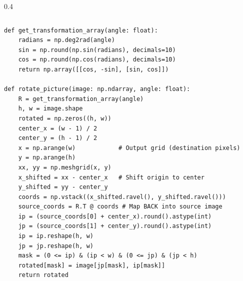 \begin{frame}
\begin{columns}[t]
\begin{column}{0.4\textwidth}

		\end{column}
	\end{columns}
\end{frame}

\begin{frame}[fragile]
\begin{verbatim}
def get_transformation_array(angle: float):
    radians = np.deg2rad(angle)
    sin = np.round(np.sin(radians), decimals=10)
    cos = np.round(np.cos(radians), decimals=10)
    return np.array([[cos, -sin], [sin, cos]])

def rotate_picture(image: np.ndarray, angle: float):
    R = get_transformation_array(angle)
    h, w = image.shape
    rotated = np.zeros((h, w))
    center_x = (w - 1) / 2
    center_y = (h - 1) / 2
    x = np.arange(w)            # Output grid (destination pixels)
    y = np.arange(h)
    xx, yy = np.meshgrid(x, y)
    x_shifted = xx - center_x	# Shift origin to center
    y_shifted = yy - center_y
    coords = np.vstack((x_shifted.ravel(), y_shifted.ravel()))
    source_coords = R.T @ coords # Map BACK into source image
    ip = (source_coords[0] + center_x).round().astype(int)
    jp = (source_coords[1] + center_y).round().astype(int)
    ip = ip.reshape(h, w)
    jp = jp.reshape(h, w)
    mask = (0 <= ip) & (ip < w) & (0 <= jp) & (jp < h)
    rotated[mask] = image[jp[mask], ip[mask]]
    return rotated
\end{verbatim}
\end{frame}

